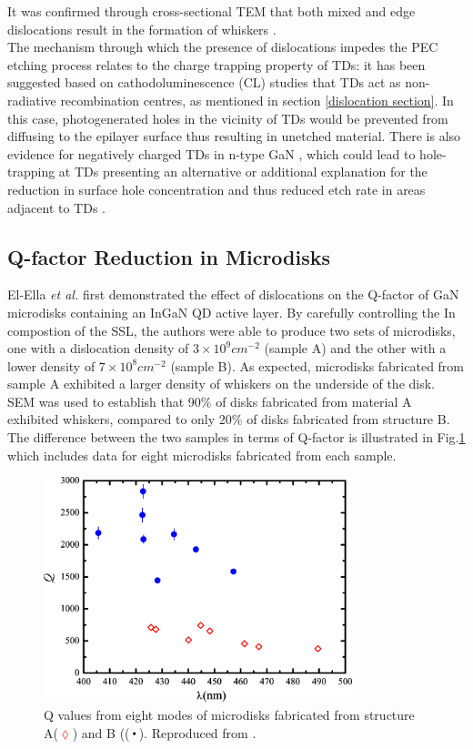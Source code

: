It was confirmed through cross-sectional TEM that both mixed and edge dislocations result in the formation of whiskers \cite{Youtsey1998}.\\
The mechanism through which the presence of dislocations impedes the PEC etching process relates to the charge trapping property of TDs: it has been suggested based on cathodoluminescence (CL) studies that TDs act as non-radiative recombination centres, as mentioned in section \ref{dislocation section}. In this case, photogenerated holes in the vicinity of TDs would be prevented from diffusing to the epilayer surface thus resulting in unetched material. There is also evidence for negatively charged TDs in n-type GaN \cite{Cherns2000}, which could lead to hole-trapping at TDs presenting an alternative or additional explanation for the reduction in surface hole concentration and thus reduced etch rate in areas adjacent to TDs \cite{Youtsey1998}.

\subsection{Q-factor Reduction in Microdisks}
\label{Q-factor reduction}
El-Ella \textit{et al.} first demonstrated the effect of dislocations on the Q-factor of GaN microdisks containing an InGaN QD active layer. By carefully controlling the In compostion of the SSL, the authors were able to produce two sets of microdisks, one with a dislocation density of $3 \times 10^{9} cm^{-2}$ (sample A) and the other with a lower density of $7 \times 10^{8} cm^{-2}$ (sample B). As expected, microdisks fabricated from sample A exhibited a larger density of whiskers on the underside of the disk. SEM was used to establish that 90$\%$ of disks fabricated from material A exhibited whiskers, compared to only 20$\%$  of disks fabricated from structure B. The difference between the two samples in terms of Q-factor is illustrated in Fig.\ref{El-Ellacomp} which includes data for eight microdisks fabricated from each sample. 

\begin{figure}[h]
	\centering
	\includegraphics[width=0.8\textwidth]{Figs/Ch4/elellacomp.png}
	\caption {Q values from eight modes of microdisks fabricated from structure A(\textcolor{red}{$\lozenge$}) and B ((\textcolor{blue}{$\Bigcdot$}). Reproduced from \cite{El-Ella2011}.}
	\label{El-Ellacomp}
\end{figure}
\FloatBarrier 

